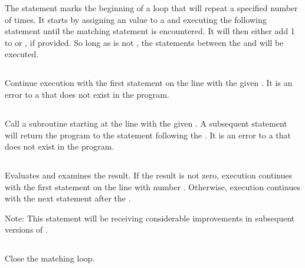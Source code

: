 \documentclass{article}
\begin{document}
    The  statement marks the beginning of a loop that will repeat a specified number of times.
    It starts by assigning an  value to a  and executing the following statement until
    the matching  statement is encountered. It will then either add 1 to  or
    , if provided. So long as  is not , the statements between the
     and  will be executed.

    \subsection{ }

    Continue execution with the first statement on the line with the given .
    It is an error to  a  that does not exist in the program.

    \subsection{ }

    Call a subroutine starting at the line with the given .
    A subsequent  statement will return the program to the statement
    following the .
    It is an error to  a  that does not exist in the program.

    \subsection{   }

    Evaluates  and examines the result.
    If the result is not zero, execution continues with the first statement on the line with number .
    Otherwise, execution continues with the next statement after the .

    Note: This statement will be receiving considerable improvements in subsequent versions of \BASIC.

    \subsection{}

    Close the matching  loop.
\end{document}
